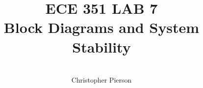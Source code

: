 



\documentclass[12pt]{article}

\usepackage[english]{babel}
\usepackage[utf8x]{inputenc}
\usepackage[T1]{fontenc}
\usepackage{graphicx}
\usepackage{amsmath}
\usepackage{caption}
\usepackage{float}
\usepackage{caption}
\usepackage{subcaption}
\usepackage{rotating}
\usepackage{setspace}

\usepackage[a4paper,top=3cm,bottom=2cm,left=3cm,right=3cm,marginparwidth=1.75cm]{geometry}

\usepackage[colorinlistoftodos]{todonotes}
\usepackage[colorlinks=true, allcolors=blue]{hyperref}
\usepackage{listings}
\usepackage{gensymb}
\usepackage{ mathrsfs }



\title{%
	\textbf{ ECE 351 LAB 7} \\
 Block Diagrams and System Stability 
	 }

\author{\\
	Christopher Pierson}

	
	
\vspace{\fill}
\maketitle
\vspace{\fill}
\clearpage

